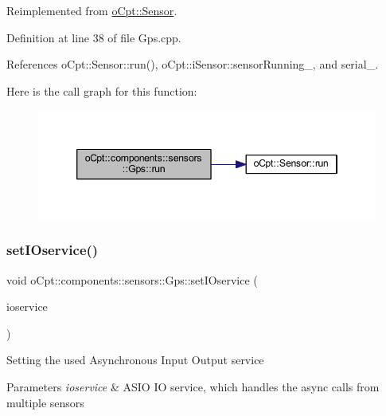 Reimplemented from \hyperlink{classo_cpt_1_1_sensor_aef25b0e5f3a8358ee81c97c73909fbe6}{o\+Cpt\+::\+Sensor}.



Definition at line 38 of file Gps.\+cpp.



References o\+Cpt\+::\+Sensor\+::run(), o\+Cpt\+::i\+Sensor\+::sensor\+Running\+\_\+, and serial\+\_\+.

Here is the call graph for this function\+:\nopagebreak
\begin{figure}[H]
\begin{center}
\leavevmode
\includegraphics[width=346pt]{classo_cpt_1_1components_1_1sensors_1_1_gps_af703c48b8b7220a1909570f46edae932_cgraph}
\end{center}
\end{figure}
\hypertarget{classo_cpt_1_1components_1_1sensors_1_1_gps_ad613b81625402daa6fdae80022fde18c}{}\label{classo_cpt_1_1components_1_1sensors_1_1_gps_ad613b81625402daa6fdae80022fde18c} 
\subsubsection{\texorpdfstring{set\+I\+Oservice()}{setIOservice()}}
{\footnotesize\ttfamily void o\+Cpt\+::components\+::sensors\+::\+Gps\+::set\+I\+Oservice (\begin{DoxyParamCaption}\item[{boost\+::shared\+\_\+ptr$<$ boost\+::asio\+::io\+\_\+service $>$}]{ioservice }\end{DoxyParamCaption})\hspace{0.3cm}{\ttfamily [virtual]}}

Setting the used Asynchronous Input Output service 
\begin{DoxyParams}{Parameters}
{\em ioservice} & A\+S\+IO IO service, which handles the async calls from multiple sensors \\
\hline
\end{DoxyParams}


